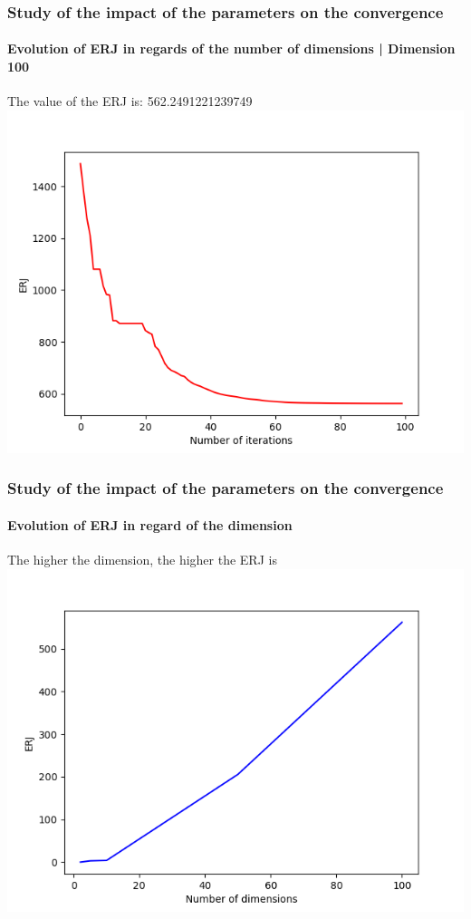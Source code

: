 \documentclass{beamer}
\begin{document}
	\begin{frame}
	\frametitle{\color{velvet} Study of the impact of the parameters on the convergence}
	\framesubtitle{Evolution of ERJ in regards of the number of dimensions | Dimension 100}
	The value of the ERJ is: 562.2491221239749
	\includegraphics[scale=0.5]{Graphs/5.png}
	\end{frame}
	\begin{frame}
	\frametitle{\color{velvet} Study of the impact of the parameters on the convergence}
	\framesubtitle{Evolution of ERJ in regard of the dimension}
	The higher the dimension, the higher the ERJ is
	\includegraphics[scale=0.5]{Graphs/6.png}
	\end{frame}
\end{document}

